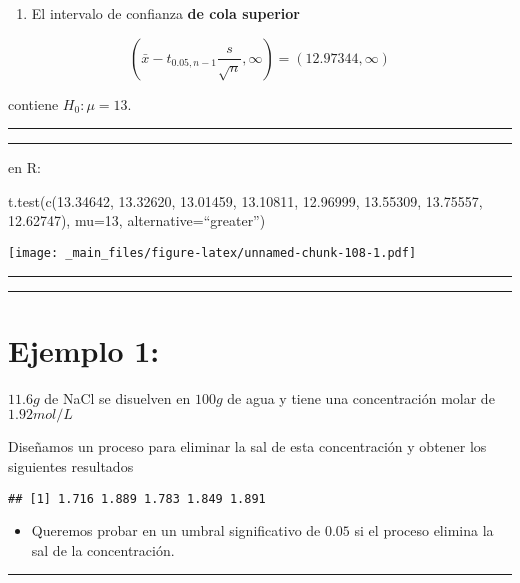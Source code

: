 \documentclass[
]{book}
\providecommand{\tightlist}{%
  \setlength{\itemsep}{0pt}\setlength{\parskip}{0pt}}
\begin{document}
\begin{enumerate}
\def\labelenumi{\arabic{enumi}.}
\setcounter{enumi}{2}
\tightlist
\item
  El intervalo de confianza \textbf{de cola superior}
\end{enumerate}

\[(\bar{x}-t_{0.05, n-1} \frac{s}{\sqrt{n}}, \infty)=(12.97344, \infty)\]

contiene \(H_0:\mu=13\).

\begin{center}\rule{0.5\linewidth}{0.5pt}\end{center}

\begin{center}\rule{0.5\linewidth}{0.5pt}\end{center}

en R:

t.test(c(13.34642, 13.32620, 13.01459, 13.10811,
12.96999, 13.55309, 13.75557, 12.62747), mu=13, alternative=``greater'')

\texttt{[image: \_main\_files/figure-latex/unnamed-chunk-108-1.pdf]}

\begin{center}\rule{0.5\linewidth}{0.5pt}\end{center}

\begin{center}\rule{0.5\linewidth}{0.5pt}\end{center}

\hypertarget{ejemplo-1-4}{%
\section{Ejemplo 1:}\label{ejemplo-1-4}}

\(11.6 g\) de NaCl se disuelven en \(100 g\) de agua y tiene una concentración molar de \(1.92 mol/L\)

Diseñamos un proceso para eliminar la sal de esta concentración y obtener los siguientes resultados

\begin{verbatim}
## [1] 1.716 1.889 1.783 1.849 1.891
\end{verbatim}

\begin{itemize}
\tightlist
\item
  Queremos probar en un umbral significativo de \(0.05\) si el proceso elimina la sal de la concentración.
\end{itemize}

\begin{center}\rule{0.5\linewidth}{0.5pt}\end{center}
\end{document}

